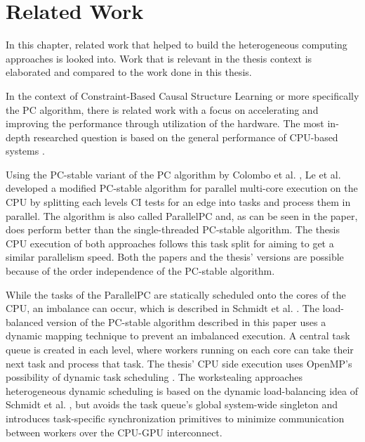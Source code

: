 \chapter{Related Work}
\label{chap:relwork}
In this chapter, related work that helped to build the heterogeneous computing approaches is looked into. Work that is relevant in the thesis context is elaborated and compared to the work done in this thesis.

In the context of Constraint-Based Causal Structure Learning or more specifically the PC algorithm, there is related work with a focus on accelerating and improving the performance through utilization of the hardware. The most in-depth researched question is based on the general performance of CPU-based systems \cite{leFastPCAlgorithm2019, leParallelPCPackageEfficient2018, schmidtLoadBalancedParallelConstraintBased2019, colomboOrderIndependentConstraintBasedCausal,kalischEstimatingHighDimensionalDirected2007,scutariBayesianNetworkConstraintBased2017, madsenParallelAlgorithmBayesian2017,madsenParallelisationPCAlgorithm2015,nguyenMrPCCausalStructure2020}. 

Using the PC-stable variant of the PC algorithm by Colombo et al. \cite{colomboOrderIndependentConstraintBasedCausal}, Le et al. \cite{leFastPCAlgorithm2019, leParallelPCPackageEfficient2018} developed a modified PC-stable algorithm for parallel multi-core execution on the CPU by splitting each levels CI tests for an edge into tasks and process them in parallel. The algorithm is also called ParallelPC and, as can be seen in the paper, does perform better than the single-threaded PC-stable algorithm. The thesis CPU execution of both approaches follows this task split for aiming to get a similar parallelism speed. Both the papers and the thesis' versions are possible because of the order independence of the PC-stable algorithm.

While the tasks of the ParallelPC are statically scheduled onto the cores of the CPU, an imbalance can occur, which is described in Schmidt et al. \cite{schmidtLoadBalancedParallelConstraintBased2019}. The load-balanced version of the PC-stable algorithm described in this paper uses a dynamic mapping technique to prevent an imbalanced execution. A central task queue is created in each level, where workers running on each core can take their next task and process that task. The thesis' CPU side execution uses OpenMP's possibility of dynamic task scheduling \cite{breshearsArtConcurrencyThread2009}. The workstealing approaches heterogeneous dynamic scheduling is based on the dynamic load-balancing idea of Schmidt et al. \cite{schmidtLoadBalancedParallelConstraintBased2019}, but avoids the task queue's global system-wide singleton and introduces task-specific synchronization primitives to minimize communication between workers over the CPU-GPU interconnect.

